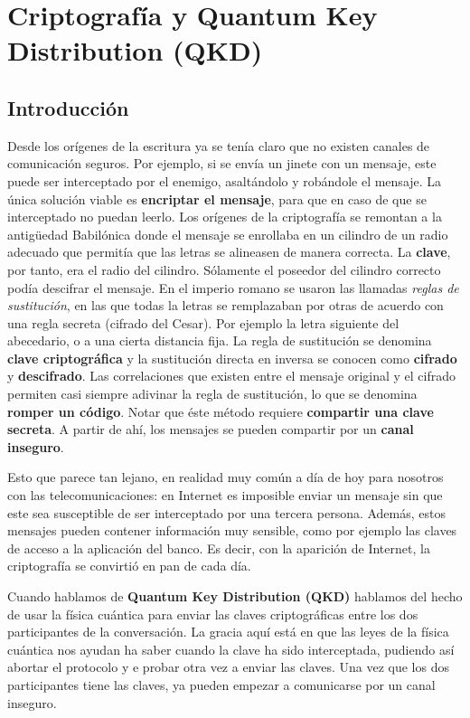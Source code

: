 \documentclass[a4paper,11pt]{book} %
\numberwithin{equation}{chapter}
\begin{document}
\chapter{Criptografía y Quantum Key Distribution (QKD)} \label{chapter_QKD}


\section{Introducción}

Desde los orígenes de la escritura ya se tenía claro que no existen canales de comunicación seguros. Por ejemplo, si se envía un jinete con un mensaje, este puede ser interceptado por el enemigo, asaltándolo y robándole el mensaje. La única solución viable es \textbf{encriptar el mensaje}, para que en caso de que se  interceptado no puedan leerlo. 
Los orígenes de la criptografía se remontan a la antigüedad Babilónica donde el mensaje se enrollaba
en un cilindro de un radio adecuado que permitía que las letras se alineasen de manera correcta. La
\textbf{clave}, por tanto, era el radio del cilindro. Sólamente el poseedor del cilindro correcto podía descifrar el
mensaje. En el imperio romano se usaron las llamadas \textit{reglas de sustitución}, en las que todas la letras se
remplazaban por otras de acuerdo con una regla secreta (cifrado del Cesar). Por ejemplo la letra siguiente
del abecedario, o a una cierta distancia fija. La regla de sustitución se denomina \textbf{clave criptográfica} y la
sustitución directa en inversa se conocen como \textbf{cifrado} y \textbf{descifrado}. Las correlaciones que existen entre el
mensaje original y el cifrado permiten casi siempre adivinar la regla de sustitución, lo que se denomina
\textbf{romper un código}. Notar que éste método requiere \textbf{compartir una clave secreta}. A partir de ahí, los
mensajes se pueden compartir por un \textbf{canal inseguro}. 

Esto que parece tan lejano, en realidad muy común a día de hoy para nosotros con las telecomunicaciones: en Internet es imposible enviar un mensaje sin que este sea susceptible de ser interceptado por una tercera persona. Además, estos mensajes pueden contener información muy sensible, como por ejemplo las claves de acceso a la aplicación del banco. Es decir, con la aparición de Internet, la criptografía se convirtió en pan de cada día. 

Cuando hablamos de \textbf{Quantum Key Distribution (QKD)} hablamos del hecho de usar la física cuántica para enviar las claves criptográficas entre los dos participantes de la conversación. La gracia aquí está en que las leyes de la física cuántica nos ayudan ha saber cuando la clave ha sido interceptada, pudiendo así abortar el protocolo y e probar otra vez a enviar las claves. Una vez que los dos participantes tiene las claves, ya pueden empezar a comunicarse por un canal inseguro.
\end{document}
